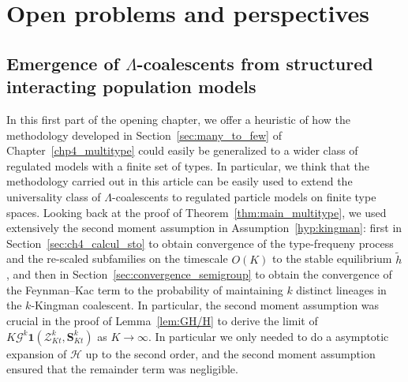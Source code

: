 \chapter[Open problem and perspectives]{Open problems and perspectives}\label{chp5_opening}


\section{Emergence of $\Lambda$-coalescents from structured interacting population models}
In this first part of the opening chapter, we offer a heuristic of how the methodology developed in Section~\ref{sec:many_to_few} of Chapter~\ref{chp4_multitype} could easily be generalized to a wider class of regulated models with a finite set of types. In particular, we think that the methodology carried out in this article can be easily used to extend the universality class of $\Lambda$-coalescents to regulated particle models on finite type spaces. 
 Looking back at the proof of Theorem~\ref{thm:main_multitype}, we used extensively the second moment assumption in Assumption~\ref{hyp:kingman}: first in Section~\ref{sec:ch4_calcul_sto} to obtain convergence of the type-frequeny process and the re-scaled subfamilies on the timescale $O(K)$ to the stable equilibrium $\tilde h$, and then in Section~\ref{sec:convergence_semigroup} to obtain the convergence of the Feynman--Kac term to the probability of maintaining $k$ distinct lineages in the $k$-Kingman coalescent. In particular, the second moment assumption was crucial in the proof of Lemma~\ref{lem:GH/H} to derive the limit of $K\mathcal{G}^k\bm{1}( \mathcal{Z}^k_{Kt},\bm S^k_{Kt})$ as $K\to\infty$. In particular we only needed to do a asymptotic expansion of $\mathcal{H}$ up to the second order, and the second moment assumption ensured that the remainder term was negligible.


